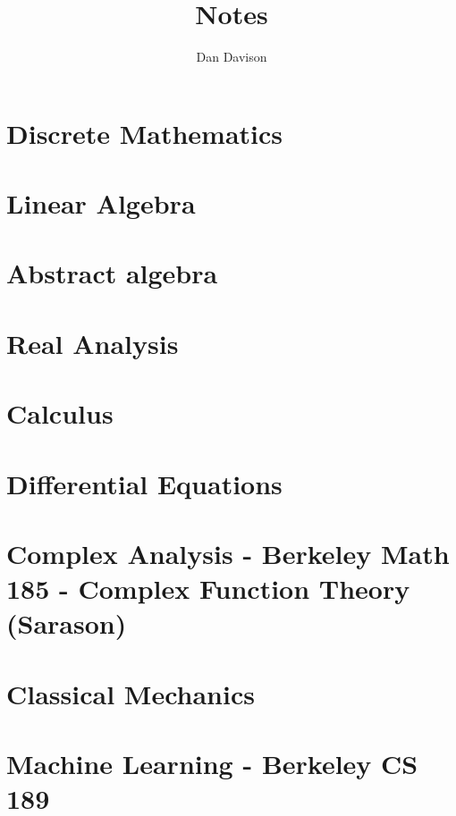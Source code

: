 \documentclass{book}
\title{Notes}
\author{Dan Davison}
\begin{document}
\frontmatter
\maketitle
\tableofcontents
\mainmatter

\chapter{Discrete Mathematics}


\chapter{Linear Algebra}


\chapter{Abstract algebra}


\chapter{Real Analysis}


\chapter{Calculus}



\chapter{Differential Equations}


\chapter{Complex Analysis - Berkeley Math 185 - Complex Function Theory (Sarason)}


\chapter{Classical Mechanics}


\chapter{Machine Learning - Berkeley CS 189}


\end{document}
